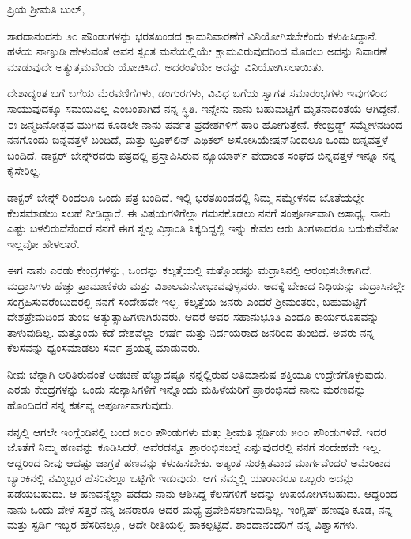 \noindent
ಪ್ರಿಯ ಶ‍್ರೀಮತಿ ಬುಲ್,

ಶಾರದಾನಂದನು ೨೦ ಪೌಂಡುಗಳನ್ನು ಭರತಖಂಡದ ಕ್ಷಾಮನಿವಾರಣೆಗೆ ವಿನಿಯೋಗಿಸಬೇಕೆಂದು ಕಳುಹಿಸಿದ್ದಾನೆ. ಹಳೆಯ ನಾಣ್ನುಡಿ ಹೇಳುವಂತೆ ಅವನ ಸ್ವಂತ ಮನೆಯಲ್ಲಿಯೇ ಕ್ಷಾಮವಿರುವುದರಿಂದ ಮೊದಲು ಅದನ್ನು ನಿವಾರಣೆ ಮಾಡುವುದೇ ಅತ್ಯುತ್ತಮವೆಂದು ಯೋಚಿಸಿದೆ. ಅದರಂತೆಯೇ ಅದನ್ನು ವಿನಿಯೋಗಿಸಲಾಯಿತು.

ದೇಶಾದ್ಯಂತ ಬಗೆ ಬಗೆಯ ಮೆರವಣಿಗೆಗಳು, ಡಂಗುರಗಳು, ವಿವಿಧ ಬಗೆಯ ಸ್ವಾಗತ ಸಮಾರಂಭಗಳು ಇವುಗಳಿಂದ ಸಾಯುವುದಕ್ಕೂ ಸಮಯವಿಲ್ಲ ಎಂಬಂತಾಗಿದೆ ನನ್ನ ಸ್ಥಿತಿ. ಇನ್ನೇನು ನಾನು ಬಹುಮಟ್ಟಿಗೆ ಮೃತನಾದಂತೆಯೆ ಆಗಿದ್ದೇನೆ. ಈ ಜನ್ಮದಿನೋತ್ಸವ ಮುಗಿದ ಕೂಡಲೇ ನಾನು ಪರ್ವತ ಪ್ರದೇಶಗಳಿಗೆ ಹಾರಿ ಹೋಗುತ್ತೇನೆ. ಕೇಂಬ್ರಿಡ್ಜ್ ಸಮ್ಮೇಳನದಿಂದ ನನಗೊಂದು ಬಿನ್ನವತ್ತಳೆ ಬಂದಿದೆ, ಮತ್ತು ಬ್ರೂಕ್‌ಲಿನ್‌ ಎಥಿಕಲ್ ಅಸೋಸಿಯೇಷನ್‌ನಿಂದಲೂ ಒಂದು ಬಿನ್ನವತ್ತಳೆ ಬಂದಿದೆ. ಡಾಕ್ಟರ್ ಜೇನ್ಸ್‌ರವರು ಪತ್ರದಲ್ಲಿ ಪ್ರಸ್ತಾಪಿಸಿರುವ ನ್ಯೂಯಾರ್ಕ್ ವೇದಾಂತ ಸಂಘದ ಬಿನ್ನವತ್ತಳೆ ಇನ್ನೂ ನನ್ನ ಕೈಸೇರಿಲ್ಲ.

ಡಾಕ್ಟರ್ ಜೇನ್ಸ್ ರಿಂದಲೂ ಒಂದು ಪತ್ರ ಬಂದಿದೆ. ಇಲ್ಲಿ ಭರತಖಂಡದಲ್ಲಿ ನಿಮ್ಮ ಸಮ್ಮೇಳನದ ಜೊತೆಯಲ್ಲೇ ಕೆಲಸಮಾಡಲು ಸಲಹೆ ನೀಡಿದ್ದಾರೆ. ಈ ವಿಷಯಗಳಿಗೆಲ್ಲಾ ಗಮನಕೊಡಲು ನನಗೆ ಸಂಪೂರ್ಣವಾಗಿ ಅಸಾಧ್ಯ. ನಾನು ಎಷ್ಟು ಬಳಲಿರುವೆನೆಂದರೆ ನನಗೆ ಈಗ ಸ್ವಲ್ಪ ವಿಶ್ರಾಂತಿ ಸಿಕ್ಕದಿದ್ದಲ್ಲಿ ಇನ್ನು ಕೇವಲ ಆರು ತಿಂಗಳಾದರೂ ಬದುಕುವೆನೋ ಇಲ್ಲವೋ ಹೇಳಲಾರೆ.

ಈಗ ನಾನು ಎರಡು ಕೇಂದ್ರಗಳನ್ನು, ಒಂದನ್ನು ಕಲ್ಕತ್ತೆಯಲ್ಲಿ ಮತ್ತೊಂದನ್ನು ಮದ್ರಾಸಿನಲ್ಲಿ ಆರಂಭಿಸಬೇಕಾಗಿದೆ. ಮದ್ರಾಸಿಗಳು ಹೆಚ್ಚು ಪ್ರಾಮಾಣಿಕರು ಮತ್ತು ವಿಶಾಲಮನೋಭಾವವುಳ್ಳವರು. ಅದಕ್ಕೆ ಬೇಕಾದ ನಿಧಿಯನ್ನು ಮದ್ರಾಸಿನಲ್ಲೇ ಸಂಗ್ರಹಿಸುವರೆಂಬುದರಲ್ಲಿ ನನಗೆ ಸಂದೇಹವೇ ಇಲ್ಲ. ಕಲ್ಕತ್ತೆಯ ಜನರು ಎಂದರೆ ಶ‍್ರೀಮಂತರು, ಬಹುಮಟ್ಟಿಗೆ ದೇಶಪ್ರೇಮದಿಂದ ತುಂಬಿ ಅತ್ಯುತ್ಸಾಹಿಗಳಾಗಿರುವರು. ಆದರೆ ಅವರ ಸಹಾನುಭೂತಿ ಎಂದೂ ಕಾರ್ಯರೂಪವನ್ನು ತಾಳುವುದಿಲ್ಲ. ಮತ್ತೊಂದು ಕಡೆ ದೇಶವೆಲ್ಲಾ ಈರ್ಷೆ ಮತ್ತು ನಿರ್ದಯರಾದ ಜನರಿಂದ ತುಂಬಿದೆ. ಅವರು ನನ್ನ ಕೆಲಸವನ್ನು ಧ್ವಂಸಮಾಡಲು ಸರ್ವ ಪ್ರಯತ್ನ ಮಾಡುವರು.

ನೀವು ಚೆನ್ನಾಗಿ ಅರಿತಿರುವಂತೆ ಅಡಚಣೆ ಹೆಚ್ಚಾದಷ್ಟೂ ನನ್ನಲ್ಲಿರುವ ಅತಿಮಾನುಷ ಶಕ್ತಿಯೂ ಉದ್ರೇಕಗೊಳ್ಳುವುದು. ಎರಡು ಕೇಂದ್ರಗಳನ್ನು ಒಂದು ಸಂನ್ಯಾಸಿಗಳಿಗೆ ಇನ್ನೊಂದು ಮಹಿಳೆಯರಿಗೆ\enginline{-} ಪ್ರಾರಂಭಿಸದೆ ನಾನು ಮರಣವನ್ನು ಹೊಂದಿದರೆ ನನ್ನ ಕರ್ತವ್ಯ ಅಪೂರ್ಣವಾಗುವುದು.

ನನ್ನಲ್ಲಿ ಆಗಲೇ ಇಂಗ್ಲೆಂಡಿನಲ್ಲಿ ಬಂದ ೫೦೦ ಪೌಂಡುಗಳು ಮತ್ತು ಶ‍್ರೀಮತಿ ಸ್ಟರ್ಡಿಯ ೫೦೦ ಪೌಂಡುಗಳಿವೆ. ಇದರ ಜೊತೆಗೆ ನಿಮ್ಮ ಹಣವನ್ನು ಕೂಡಿಸಿದರೆ, ಅವೆರಡನ್ನೂ ಪ್ರಾರಂಭಿಸಬಲ್ಲೆ ಎನ್ನುವುದರಲ್ಲಿ ನನಗೆ ಸಂದೇಹವೇ ಇಲ್ಲ. ಆದ್ದರಿಂದ ನೀವು ಆದಷ್ಟು ಜಾಗ್ರತೆ ಹಣವನ್ನು ಕಳುಹಿಸಬೇಕು. ಅತ್ಯಂತ ಸುರಕ್ಷಿತವಾದ ಮಾರ್ಗವೆಂದರೆ ಅಮೆರಿಕಾದ ಬ್ಯಾಂಕಿನಲ್ಲಿ ನಮ್ಮಿಬ್ಬರ ಹೆಸರಿನಲ್ಲೂ ಒಟ್ಟಿಗೇ ಇಡುವುದು. ಆಗ ನಮ್ಮಲ್ಲಿ ಯಾರಾದರೂ ಒಬ್ಬರು ಅದನ್ನು ಪಡೆಯಬಹುದು. ಆ ಹಣವನ್ನೆಲ್ಲಾ ಪಡೆದು ನಾನು ಆಶಿಸಿದ್ದ ಕೆಲಸಗಳಿಗೆ ಅದನ್ನು ಉಪಯೋಗಿಸಬಹುದು. ಆದ್ದರಿಂದ ನಾನು ಒಂದು ವೇಳೆ ಸತ್ತರೆ ನನ್ನ ಜನರಾರೂ ಅದರ ಮಧ್ಯೆ ಪ್ರವೇಶಿಸಲಾಗುವುದಿಲ್ಲ. ಇಂಗ್ಲಿಷ್ ಹಣವೂ ಕೂಡ, ನನ್ನ ಮತ್ತು ಸ್ಟರ್ಡಿ ಇಬ್ಬರ ಹೆಸರಿನಲ್ಲೂ, ಅದೇ ರೀತಿಯಲ್ಲಿ ಹಾಕಲ್ಪಟ್ಟಿದೆ. ಶಾರದಾನಂದರಿಗೆ ನನ್ನ ವಿಶ್ವಾಸಗಳು.

